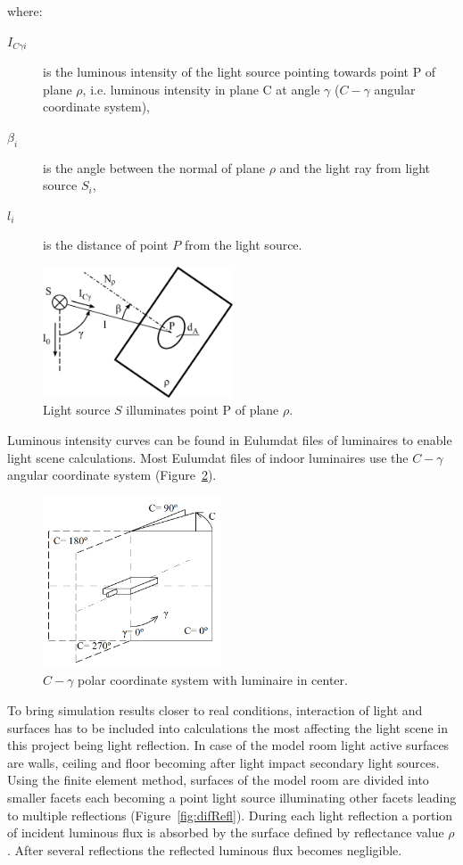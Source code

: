 where:
\begin{description}
	\item[$I_{C \gamma i}$] is the luminous intensity of the light source pointing towards point P of plane $\rho$, i.e. luminous intensity in plane C at angle $\gamma$ ($C-\gamma$ angular coordinate system),
	\item[$\beta_{i}$] is the angle between the normal of plane $\rho$ and the light ray from light source $S_{i}$,
	\item[$l_{i}$] is the distance of point $P$ from the light source.
\end{description}

\begin{figure}[htb]
  \centering
  \includegraphics[width=160pt]{315_osvetlenost_bodovym_zdrojem_2}
  \caption{Light source $S$ illuminates point P of plane $\rho$.}
  \label{fig:osv}
\end{figure}

Luminous intensity curves can be found in Eulumdat files of luminaires to enable light scene calculations. Most Eulumdat files of indoor luminaires use the $C-\gamma$ angular coordinate system (Figure~\ref{fig:cgamma}).

\begin{figure}[htb]
  \centering
  \includegraphics[width=150pt]{Cgama}
  \caption{$C-\gamma$ polar coordinate system with luminaire in center.}
  \label{fig:cgamma}
\end{figure}

To bring simulation results closer to real conditions, interaction of light and surfaces has to be included into calculations the most affecting the light scene in this project being light reflection. In case of the model room light active surfaces are walls, ceiling and floor becoming after light impact secondary light sources. Using the finite element method, surfaces of the model room are divided into smaller facets each becoming a point light source illuminating other facets leading to multiple reflections (Figure~\ref{fig:difRefl}). During each light reflection a portion of incident luminous flux is absorbed by the surface defined by reflectance value $\rho$. After several reflections the reflected luminous flux becomes negligible.

